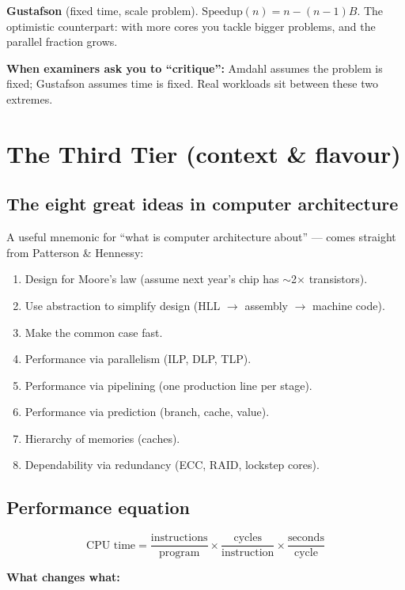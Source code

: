 \documentclass[11pt,a4paper]{article}
\begin{document}
\textbf{Gustafson} (fixed time, scale problem). $\text{Speedup}(n) = n - (n-1)B$. The optimistic counterpart: with more cores you tackle bigger problems, and the parallel fraction grows.

\textbf{When examiners ask you to ``critique'':} Amdahl assumes the problem is fixed; Gustafson assumes time is fixed. Real workloads sit between these two extremes.

\hrulefill

\section{The Third Tier (context \& flavour)}

\subsection{The eight great ideas in computer architecture}

A useful mnemonic for ``what is computer architecture about'' --- comes straight from Patterson \& Hennessy:

\begin{enumerate}[leftmargin=*,itemsep=1pt]
  \item Design for Moore's law (assume next year's chip has $\sim$2$\times$ transistors).
  \item Use abstraction to simplify design (HLL $\rightarrow$ assembly $\rightarrow$ machine code).
  \item Make the common case fast.
  \item Performance via parallelism (ILP, DLP, TLP).
  \item Performance via pipelining (one production line per stage).
  \item Performance via prediction (branch, cache, value).
  \item Hierarchy of memories (caches).
  \item Dependability via redundancy (ECC, RAID, lockstep cores).
\end{enumerate}

\subsection{Performance equation}

$$\text{CPU time} = \frac{\text{instructions}}{\text{program}} \times \frac{\text{cycles}}{\text{instruction}} \times \frac{\text{seconds}}{\text{cycle}}$$

\textbf{What changes what:}
\end{document}
